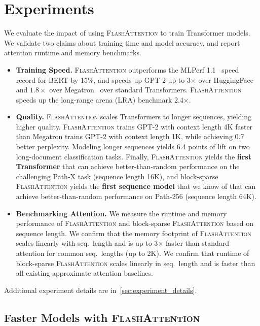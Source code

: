 \section{Experiments}
\label{sec:exp}

We evaluate the impact of using \textsc{FlashAttention} to train Transformer models. We validate two claims about training time and model accuracy, and report attention runtime and memory benchmarks.

\begin{itemize}[itemsep=0.1pt,topsep=0pt,leftmargin=*]
    \item \textbf{Training Speed.} \textsc{FlashAttention} outperforms the MLPerf 1.1~\citep{mattson2020mlperf} speed record for BERT by 15\%, and speeds up GPT-2 up to 3$\times$ over HuggingFace~\citep{wolf-etal-2020-transformers} and $1.8\times$ over Megatron~\citep{shoeybi2019megatron} over standard Transformers.
    \textsc{FlashAttention} speeds up the long-range arena (LRA) benchmark 2.4$\times$. 
    \item \textbf{Quality.} \textsc{FlashAttention} scales Transformers to longer sequences, yielding higher quality. 
    \textsc{FlashAttention} trains GPT-2 with context length 4K faster than Megatron trains GPT-2 with context length 1K, while achieving 0.7 better perplexity. Modeling longer sequences yields 6.4 points of lift on two long-document classification tasks. Finally, \textsc{FlashAttention} yields the \textbf{first Transformer} that can achieve better-than-random performance on the challenging Path-X task (sequence length 16K), and block-sparse \textsc{FlashAttention} yields the \textbf{first sequence model} that we know of that can achieve better-than-random performance on Path-256 (sequence length 64K).
    \item \textbf{Benchmarking Attention.} We measure the runtime and memory performance of \textsc{FlashAttention} and block-sparse \textsc{FlashAttention} based on sequence length. We confirm that the memory footprint of \textsc{FlashAttention} scales linearly with seq.\
length and is up to 3$\times$ faster than standard attention for common seq.\
lengths (up to 2K). We confirm that runtime of block-sparse \textsc{FlashAttention} scales linearly in seq.\ length and is faster than all existing approximate attention baselines.
\end{itemize}

Additional experiment details are in~\ref{sec:experiment_details}.

\subsection{Faster Models with \textsc{FlashAttention}}
\label{ssec:exp_language_model}


